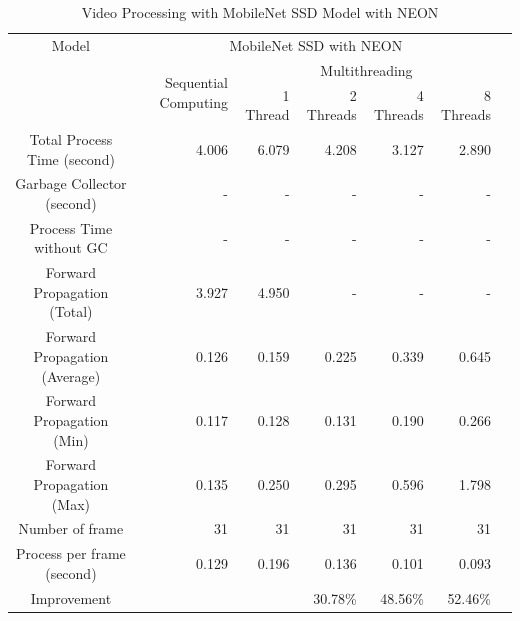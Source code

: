         \begin{table}[!htp]\centering
            \scriptsize
            \begin{tabular}{lrrrrrrr}\toprule
                \multicolumn{2}{c}{Model} &\multicolumn{5}{c}{MobileNet SSD with NEON} \\\cmidrule{1-7}
                \multicolumn{2}{c}{\multirow{2}{*}{}} &\multirow{2}{*}{Sequential Computing} &\multicolumn{4}{c}{Multithreading} \\\cmidrule{4-7}
                & & &1 Thread &2 Threads &4 Threads &8 Threads \\\midrule
                \multicolumn{2}{c}{Total Process Time (second)} &4.006 &6.079 &4.208 &3.127 &2.890 \\
                \multicolumn{2}{c}{Garbage Collector (second)} &- &- &- &- &- \\
                \multicolumn{2}{c}{Process Time without GC} &- &- &- &- &- \\
                \multicolumn{2}{c}{Forward Propagation (Total)} &3.927 &4.950 &- &- &- \\
                \multicolumn{2}{c}{Forward Propagation (Average)} &0.126 &0.159 &0.225 &0.339 &0.645 \\
                \multicolumn{2}{c}{Forward Propagation (Min)} &0.117 &0.128 &0.131 &0.190 &0.266 \\
                \multicolumn{2}{c}{Forward Propagation (Max)} &0.135 &0.250 &0.295 &0.596 &1.798 \\
                \multicolumn{2}{c}{Number of frame} &31 &31 &31 &31 &31 \\
                \multicolumn{2}{c}{Process per frame (second)} &0.129 &0.196 &0.136 &0.101 &0.093 \\
                \multicolumn{2}{c}{Improvement} & & &30.78\% &48.56\% &52.46\% \\
                \bottomrule
            \end{tabular}

            \caption{Video Processing with MobileNet SSD Model with NEON}\label{ssd:neon-performance}
        \end{table}

